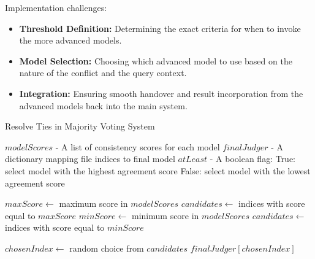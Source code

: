 Implementation challenges:
\begin{itemize}
    \item \textbf{Threshold Definition:} Determining the exact criteria for when to invoke the more advanced models.
    \item \textbf{Model Selection:} Choosing which advanced model to use based on the nature of the conflict and the query context.
    \item \textbf{Integration:} Ensuring smooth handover and result incorporation from the advanced models back into the main system.
\end{itemize}

\begin{algorithm}
    \footnotesize
    \caption{Resolve Ties in Majority Voting System}
    \begin{algorithmic}[1]
        \Require
        \Statex $modelScores$ - A list of consistency scores for each model
        \Statex $finalJudger$ - A dictionary mapping file indices to final model
        \Statex $atLeast$ - A boolean flag:
        \Statex \hspace{1em} True: select model with the highest agreement score
        \Statex \hspace{1em} False: select model with the lowest agreement score

                \State $maxScore \gets $ maximum score in $modelScores$
                \State $candidates \gets $ indices with score equal to $maxScore$
            \Else
                \State $minScore \gets $ minimum score in $modelScores$
                \State $candidates \gets $ indices with score equal to $minScore$
            \EndIf

            \State $chosenIndex \gets $ random choice from $candidates$
            \State \Return $finalJudger[chosenIndex]$
        \EndProcedure
    \end{algorithmic}\label{alg:model-selection}
\end{algorithm}

